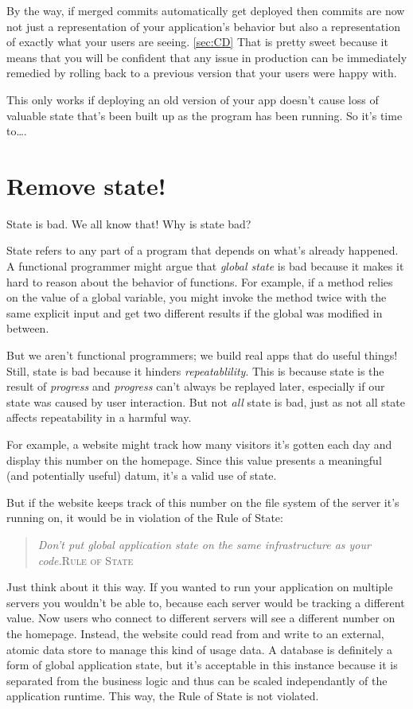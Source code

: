 \documentclass{article}
\newcommand{\noterm}[1]{\textit{#1}}
\newcommand{\term}[1]{\noterm{#1}\index{#1}}
\newcommand{\newp}{\newline\indent}
\newcommand{\imp}[2]{
  \begin{quote}
    \textit{#2}\newp \textsc{#1}
  \end{quote}
}
\begin{document}
By the way, if merged commits automatically get deployed then commits are now not just a representation of your application's behavior but also a representation of exactly what your users are seeing. \ref{sec:CD}
That is pretty sweet because it means that you will be confident that any issue in production can be immediately remedied by rolling back to a previous version that your users were happy with.

This only works if deploying an old version of your app doesn't cause loss of valuable state that's been built up as the program has been running.
So it's time to\ldots.

\section{Remove state!}

State is bad.
We all know that!
Why is state bad?

State refers to any part of a program that depends on what's already happened.
A functional programmer might argue that \textit{global state} is bad because it makes it hard to reason about the behavior of functions.
For example, if a method relies on the value of a global variable, you might invoke the method twice with the same explicit input and get two different results if the global was modified in between.

But we aren't functional programmers; we build real apps that do useful things!
Still, state is bad because it hinders \term{repeatablility}.
This is because state is the result of \term{progress} and \term{progress} can't always be replayed later, especially if our state was caused by user interaction.
But not \textit{all} state is bad, just as not all state affects repeatability in a harmful way.

For example, a website might track how many visitors it's gotten each day and display this number on the homepage.
Since this value presents a meaningful (and potentially useful) datum, it's a valid use of state.

But if the website keeps track of this number on the file system of the server it's running on, it would be in violation of the Rule of State:
\imp{Rule of State}{Don't put global application state on the same infrastructure as your code.}

Just think about it this way.
If you wanted to run your application on multiple servers you wouldn't be able to, because each server would be tracking a different value.
Now users who connect to different servers will see a different number on the homepage.
Instead, the website could read from and write to an external, atomic data store to manage this kind of usage data.
A database is definitely a form of global application state, but it's acceptable in this instance because it is separated from the business logic and thus can be scaled independantly of the application runtime.
This way, the Rule of State is not violated.
\end{document}
